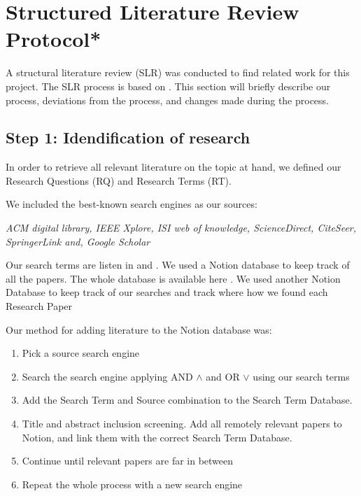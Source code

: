 
\section{Structured Literature Review Protocol*}
\label{section:BT:SLR}

A structural literature review (SLR) was conducted to find related work for this project.
The SLR process is based on \cite{AndersKofod-Petersen2018}.
This section will briefly describe our process, deviations from the process,
and changes made during the process.

\subsection{Step 1: Idendification of research}
In order to retrieve all relevant literature on the topic at hand, we defined our
Research Questions (RQ) and Research Terms (RT).

We included the best-known search engines as our sources:

\textit{
  ACM digital library,
  IEEE Xplore,
  ISI web of knowledge,
  ScienceDirect,
  CiteSeer,
  SpringerLink and,
  Google Scholar
}

Our search terms are listen in  and .
We used a Notion database to keep track of all the papers. The whole database is available here
\cite{slrdatabase}.
We used another Notion Database to keep track of our searches and track where how we found each Research Paper
\cite{searchtermtable}

Our method for adding literature to the Notion database was:
\begin{enumerate}
  \item Pick a source search engine
  \item Search the search engine applying AND $\wedge$ and OR $\vee$ using our search terms
  \item Add the Search Term and Source combination to the Search Term Database.
  \item Title and abstract inclusion screening. Add all remotely relevant papers to Notion, and link them with the correct Search Term Database.
  \item Continue until relevant papers are far in between
  \item Repeat the whole process with a new search engine
\end{enumerate}

